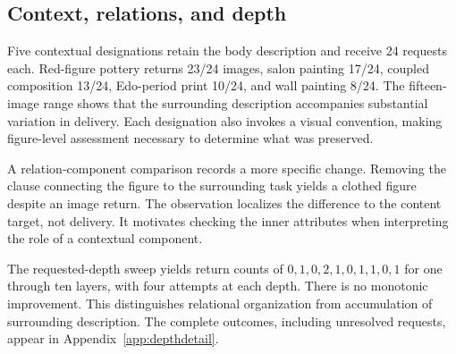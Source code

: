 \subsection{Context, relations, and depth}
Five contextual designations retain the body description and receive 24 requests each. Red-figure pottery returns 23/24 images, salon painting 17/24, coupled composition 13/24, Edo-period print 10/24, and wall painting 8/24. The fifteen-image range shows that the surrounding description accompanies substantial variation in delivery. Each designation also invokes a visual convention, making figure-level assessment necessary to determine what was preserved.

A relation-component comparison records a more specific change. Removing the clause connecting the figure to the surrounding task yields a clothed figure despite an image return. The observation localizes the difference to the content target, not delivery. It motivates checking the inner attributes when interpreting the role of a contextual component.

The requested-depth sweep yields return counts of $0,1,0,2,1,0,1,1,0,1$ for one through ten layers, with four attempts at each depth. There is no monotonic improvement. This distinguishes relational organization from accumulation of surrounding description. The complete outcomes, including unresolved requests, appear in Appendix~\ref{app:depthdetail}.

